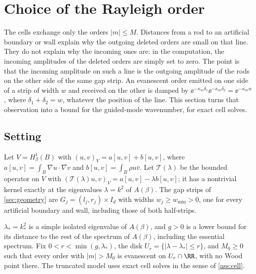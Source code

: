 \section{Choice of the Rayleigh order}\label{sec:truncation}

The cells exchange only the orders $|m|\le M$. Distances from a rod to an
artificial boundary or wall explain why the outgoing deleted orders are small
on that line. They do not
explain why the incoming ones are: in the computation, the incoming
amplitudes of the deleted orders are simply set to zero. The point is that
the incoming amplitude on such a line is the outgoing amplitude of the rods on the
other side of the same gap strip. An evanescent order emitted on one side of a
strip of width $w$ and received on the other is damped by
$\ee^{-\kappa_m\delta_1}\ee^{-\kappa_m\delta_2}=\ee^{-\kappa_mw}$, where
$\delta_1+\delta_2=w$, whatever the position of the line. This section turns
that observation into a bound for the guided-mode wavenumber, for exact cell
solves.

\subsection{Setting}
Let $V=H^1_\beta(B)$ with $(u,v)_V=a[u,v]+b[u,v]$, where
$a[u,v]=\int_B\nabla u\cdot\overline{\nabla v}$ and $b[u,v]=\int_B\rho u\bar v$. Let
$\mathcal T(\lambda)$ be the bounded operator on $V$ with
$(\mathcal T(\lambda)u,v)_V=a[u,v]-\lambda b[u,v]$; it has a nontrivial kernel exactly
at the eigenvalues $\lambda=k^2$ of $A(\beta)$. The gap strips of
\cref{sec:geometry} are $G_j=(l_j,r_j)\times I_d$ with widths $w_j\ge w_{\min}>0$,
one for every artificial boundary and wall, including those of both half-strips.

\begin{assumption}\label{ass:truncation}
$\lambda_*=k_*^2$ is a simple isolated eigenvalue of $A(\beta)$, and $g>0$ is a
lower bound for its distance to the rest of the spectrum of $A(\beta)$,
including the essential spectrum. Fix $0<r<\min(g,\lambda_*)$, the disk
$U_r=\{|\lambda-\lambda_*|\le r\}$, and $M_0\ge0$ such that every order with
$|m|>M_0$ is evanescent on $U_r\cap\RR$, with no Wood point there. The
truncated model uses exact cell solves in the sense of \cref{ass:cell}.
\end{assumption}

